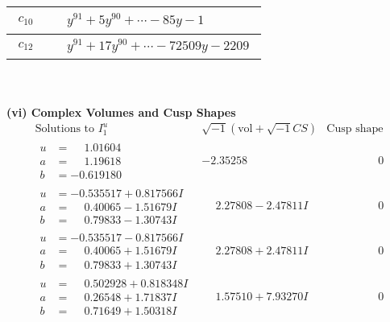 \documentclass[1p]{elsarticle_modified}
\theoremstyle{definition}
\newcommand{\I}{\sqrt{-1}}
\begin{document}
\begin{tabular}{m{50pt}|m{274pt}}
\hline $$\begin{aligned}c_{10}\end{aligned}$$&$\begin{aligned}
&y^{91}+5 y^{90}+\cdots-85 y-1
\end{aligned}$\\
\hline $$\begin{aligned}c_{12}\end{aligned}$$&$\begin{aligned}
&y^{91}+17 y^{90}+\cdots-72509 y-2209
\end{aligned}$\\
\hline
\end{tabular}\\~\\
\newpage\flushleft \textbf{(vi) Complex Volumes and Cusp Shapes}
$$\begin{array}{c|c|c}  
\text{Solutions to }I^u_{1}& \I (\text{vol} + \sqrt{-1}CS) & \text{Cusp shape}\\
 \hline 
\begin{aligned}
u &= \phantom{-}1.01604\phantom{ +0.000000I} \\
a &= \phantom{-}1.19618\phantom{ +0.000000I} \\
b &= -0.619180\phantom{ +0.000000I}\end{aligned}
 & -2.35258\phantom{ +0.000000I} & \phantom{-0.000000 } 0 \\ \hline\begin{aligned}
u &= -0.535517 + 0.817566 I \\
a &= \phantom{-}0.40065 - 1.51679 I \\
b &= \phantom{-}0.79833 - 1.30743 I\end{aligned}
 & \phantom{-}2.27808 - 2.47811 I & \phantom{-0.000000 } 0 \\ \hline\begin{aligned}
u &= -0.535517 - 0.817566 I \\
a &= \phantom{-}0.40065 + 1.51679 I \\
b &= \phantom{-}0.79833 + 1.30743 I\end{aligned}
 & \phantom{-}2.27808 + 2.47811 I & \phantom{-0.000000 } 0 \\ \hline\begin{aligned}
u &= \phantom{-}0.502928 + 0.818348 I \\
a &= \phantom{-}0.26548 + 1.71837 I \\
b &= \phantom{-}0.71649 + 1.50318 I\end{aligned}
 & \phantom{-}1.57510 + 7.93270 I & \phantom{-0.000000 } 0 \\ \hline\begin{aligned}

\end{aligned}
\end{array}$$
\end{document}
